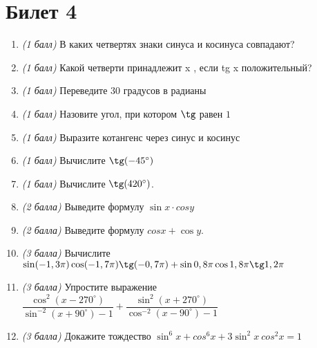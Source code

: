 \documentclass[12pt, a4paper]{article}
\begin{document}
\section*{Билет 4}
\begin{enumerate}
	\item \textit{(1 балл)}	В каких четвертях знаки синуса и косинуса совпадают? 
	\item \textit{(1 балл)}	Какой четверти принадлежит x , если tg x положительный?
	\item \textit{(1 балл)}	Переведите 30 градусов в радианы
	\item \textit{(1 балл)}	Назовите угол, при котором $\tg$  равен $1$
	\item \textit{(1 балл)} Выразите котангенс через синус и косинус
	\item \textit{(1 балл)} Вычислите $\tg (-45^{\circ})$
	\item \textit{(1 балл)}	Вычислите $\tg (420^{\circ})$.
	\item \textit{(2 балла)} Выведите формулу $\sin x \cdot cos y$ 
	\item \textit{(2 балла)} Выведите формулу $cos x + \cos y$.
	\item \textit{(3 балла)} Вычислите $\sin(-1,3\pi) \cos (-1,7 \pi) \tg (-0,7 \pi)+ \sin 0,8 \pi \cos 1,8 \pi \tg 1,2 \pi$
	\item \textit{(3 балла)} Упростите выражение $\dfrac{\cos^2 (x-270^{\circ})}{\sin^{-2}(x+90^{\circ})-1}+\dfrac{\sin^2 (x+270^{\circ})}{\cos^{-2}(x-90^{\circ})-1}$
	\item \textit{(3 балла)} Докажите тождество $\sin^6x + cos^6x + 3\sin^2x \ cos^2x = 1$
\end{enumerate}


\newpage 
\end{document}
